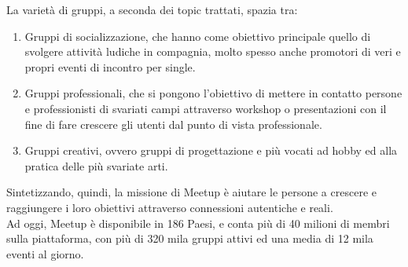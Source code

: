 \documentclass[fleqn,10pt]{SelfArx} %
\begin{document}
{La varietà di gruppi, a seconda dei topic trattati, spazia tra:
\begin{enumerate}
\item Gruppi di socializzazione, che hanno come obiettivo principale quello di svolgere attività ludiche in compagnia, molto spesso anche promotori di veri e propri eventi di incontro per single.
\item Gruppi professionali, che si pongono l'obiettivo di mettere in contatto persone e professionisti di svariati campi attraverso workshop o presentazioni con il fine di fare crescere gli utenti dal punto di vista professionale.
\item Gruppi creativi, ovvero gruppi di progettazione e più vocati ad hobby ed alla pratica delle più svariate arti. \\
\end{enumerate}
Sintetizzando, quindi, la missione di Meetup è aiutare le persone a crescere e raggiungere i loro obiettivi attraverso connessioni autentiche e reali. \\
Ad oggi, Meetup è disponibile in 186 Paesi, e conta più di 40 milioni di membri sulla piattaforma, con più di 320 mila gruppi attivi ed una media di 12 mila eventi al giorno.
}
\end{document}
